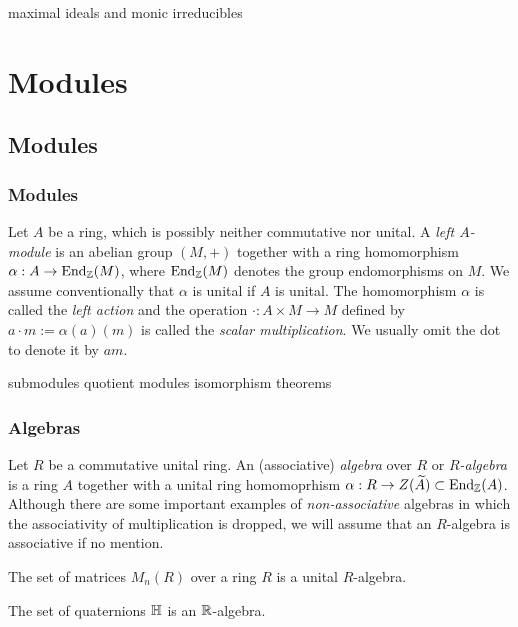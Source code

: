 \documentclass{../../large}
\begin{document}
maximal ideals and monic irreducibles






\part{Modules}



\chapter{Modules}
\section{Modules}

\begin{prb}
Let $A$ be a ring, which is possibly neither commutative nor unital.
A \emph{left $A$-module} is an abelian group $(M,+)$ together with a ring homomorphism $\alpha:A\to\operatorname{End}_{\mathbb{Z}}(M)$, where $\operatorname{End}_{\mathbb{Z}}(M)$ denotes the group endomorphisms on $M$.
We assume conventionally that $\alpha$ is unital if $A$ is unital.
The homomorphism $\alpha$ is called the \emph{left action} and the operation $\cdot:A\times M\to M$ defined by $a\cdot m:=\alpha(a)(m)$ is called the \emph{scalar multiplication}.
We usually omit the dot to denote it by $am$.
\begin{parts}
\item
\end{parts}
\end{prb}

submodules
quotient modules
isomorphism theorems


\section{Algebras}
\begin{prb}
Let $R$ be a commutative unital ring.
An (associative) \emph{algebra} over $R$ or \emph{$R$-algebra} is a ring $A$ together with a unital ring homomoprhism $\alpha:R\to Z(\widetilde A)\subset\operatorname{End}_{\mathbb{Z}}(A)$.
Although there are some important examples of \emph{non-associative} algebras in which the associativity of multiplication is dropped, we will assume that an $R$-algebra is associative if no mention.
\begin{parts}
\item The set of matrices $M_n(R)$ over a ring $R$ is a unital $R$-algebra.
\item The set of quaternions $\mathbb{H}$ is an $\mathbb{R}$-algebra.
\end{parts}
\end{prb}
\end{document}
